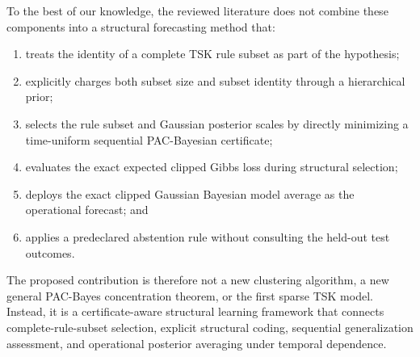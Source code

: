 To the best of our knowledge, the reviewed literature does not combine these components into a structural forecasting method that:
\begin{enumerate}
	\item treats the identity of a complete TSK rule subset as part of the 	hypothesis;
	\item explicitly charges both subset size and subset identity through a hierarchical prior;
	\item selects the rule subset and Gaussian posterior scales by directly minimizing a time-uniform sequential PAC-Bayesian certificate;
	\item evaluates the exact expected clipped Gibbs loss during structural selection;
	\item deploys the exact clipped Gaussian Bayesian model average as the operational forecast; and
	\item applies a predeclared abstention rule without consulting the held-out test outcomes.
\end{enumerate}

The proposed contribution is therefore not a new clustering algorithm, a new general PAC-Bayes concentration theorem, or the first sparse TSK model.
Instead, it is a certificate-aware structural learning framework that connects complete-rule-subset selection, explicit structural coding, sequential
generalization assessment, and operational posterior averaging under temporal dependence.
